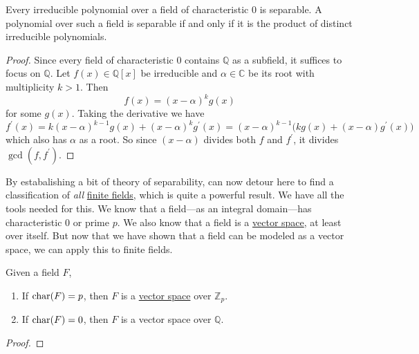   \begin{corollary}
    \label{thm:sep_char}
    Every irreducible polynomial over a field of characteristic $0$ is separable. A polynomial over such a field is separable if and only if it is the product of distinct irreducible polynomials. 
  \end{corollary}
  \begin{proof}
    Since every field of characteristic $0$ contains $\mathbb{Q}$ as a subfield, it suffices to focus on $\mathbb{Q}$. Let $f(x) \in \mathbb{Q}[x]$ be irreducible and $\alpha \in \mathbb{C}$ be its root with multiplicity $k > 1$. Then 
    \begin{equation}
      f(x) = (x - \alpha)^k g(x)
    \end{equation}
    for some $g(x)$. Taking the derivative we have 
    \begin{equation}
      f^\prime(x) = k (x - \alpha)^{k-1} g(x) + (x - \alpha)^k g^\prime (x) = (x - \alpha)^{k-1} \big( k g(x) + (x - \alpha) g^\prime(x) \big)
    \end{equation}
    which also has $\alpha$ as a root. So since $(x - \alpha)$ divides both $f$ and $f^\prime$, it divides $\gcd(f, f^\prime)$. 
  \end{proof}

  By estabalishing a bit of theory of separability, can now detour here to find a classification of \textit{all} \hyperref[thm:finite-fields]{finite fields}, which is quite a powerful result. We have all the tools needed for this. We know that a field---as an integral domain---has characteristic $0$ or prime $p$. We also know that a field is a \hyperref[def:vector-space]{vector space}, at least over itself. But now that we have shown that a field can be modeled as a vector space, we can apply this to finite fields. 

  \begin{theorem}
    \label{thm:char_field}
    Given a field $F$, 
    \begin{enumerate}
      \item If $\operatorname{char}(F) = p$, then $F$ is a \hyperref[def:vector-space]{vector space} over $\mathbb{Z}_p$. 
      \item If $\operatorname{char}(F) = 0$, then $F$ is a vector space over $\mathbb{Q}$. 
    \end{enumerate}
  \end{theorem}
  \begin{proof}
    
  \end{proof} 

